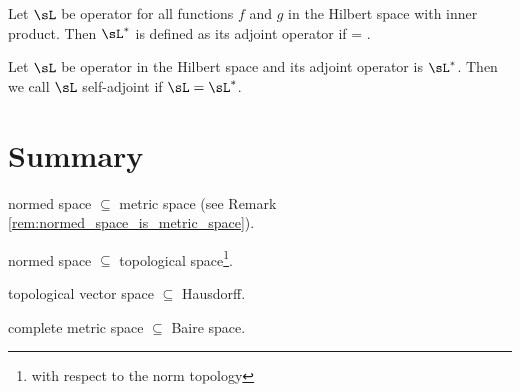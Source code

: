\begin{definition}
Let $\sL$ be operator for all functions $f$ and $g$ in the Hilbert space with inner product. Then $\sL^*$ is defined as its adjoint operator if
\be
{} = .
\ee
\end{definition}

\begin{definition}
Let $\sL$ be operator in the Hilbert space and its adjoint operator is $\sL^*$. Then we call $\sL$ self-adjoint if $\sL = \sL^*$.
\end{definition}


\section{Summary}

normed space $\subseteq$ metric space (see Remark \ref{rem:normed_space_is_metric_space}).

normed space $\subseteq$ topological space\footnote{with respect to the norm topology}.

topological vector space $\subseteq$ Hausdorff.

complete metric space $\subseteq$ Baire space.
